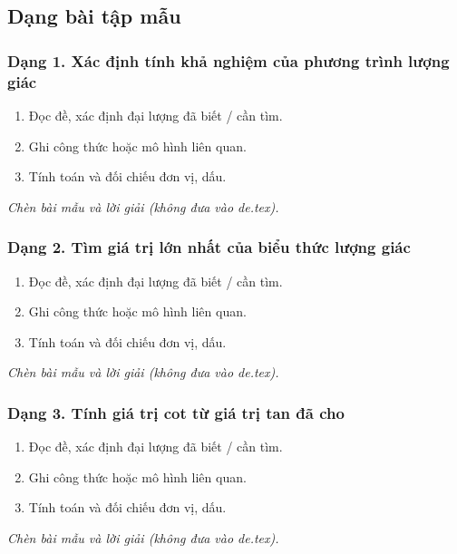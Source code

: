

\subsection{Dạng bài tập mẫu}
\subsubsection{Dạng 1. Xác định tính khả nghiệm của phương trình lượng giác}
\begin{phuongphap}
\begin{enumerate}
\item Đọc đề, xác định đại lượng đã biết / cần tìm.
\item Ghi công thức hoặc mô hình liên quan.
\item Tính toán và đối chiếu đơn vị, dấu.
\end{enumerate}
\end{phuongphap}
\begin{vidumau}
\textit{Chèn bài mẫu và lời giải (không đưa vào de.tex).}
\end{vidumau}

\subsubsection{Dạng 2. Tìm giá trị lớn nhất của biểu thức lượng giác}
\begin{phuongphap}
\begin{enumerate}
\item Đọc đề, xác định đại lượng đã biết / cần tìm.
\item Ghi công thức hoặc mô hình liên quan.
\item Tính toán và đối chiếu đơn vị, dấu.
\end{enumerate}
\end{phuongphap}
\begin{vidumau}
\textit{Chèn bài mẫu và lời giải (không đưa vào de.tex).}
\end{vidumau}

\subsubsection{Dạng 3. Tính giá trị cot từ giá trị tan đã cho}
\begin{phuongphap}
\begin{enumerate}
\item Đọc đề, xác định đại lượng đã biết / cần tìm.
\item Ghi công thức hoặc mô hình liên quan.
\item Tính toán và đối chiếu đơn vị, dấu.
\end{enumerate}
\end{phuongphap}
\begin{vidumau}
\textit{Chèn bài mẫu và lời giải (không đưa vào de.tex).}
\end{vidumau}

